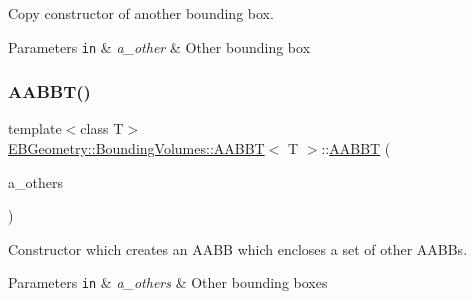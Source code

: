 Copy constructor of another bounding box. 


\begin{DoxyParams}[1]{Parameters}
\mbox{\tt in}  & {\em a\+\_\+other} & Other bounding box \\
\hline
\end{DoxyParams}
\mbox{\label{classEBGeometry_1_1BoundingVolumes_1_1AABBT_a1298160e99352a0359892b11edcfd01f}} 
\subsubsection{\texorpdfstring{A\+A\+B\+B\+T()}{AABBT()}\hspace{0.1cm}{\footnotesize\ttfamily [3/4]}}
{\footnotesize\ttfamily template$<$class T$>$ \\
\hyperlink{classEBGeometry_1_1BoundingVolumes_1_1AABBT}{E\+B\+Geometry\+::\+Bounding\+Volumes\+::\+A\+A\+B\+BT}$<$ T $>$\+::\hyperlink{classEBGeometry_1_1BoundingVolumes_1_1AABBT}{A\+A\+B\+BT} (\begin{DoxyParamCaption}\item[{const std\+::vector$<$ \hyperlink{classEBGeometry_1_1BoundingVolumes_1_1AABBT}{A\+A\+B\+BT}$<$ T $>$ $>$ \&}]{a\+\_\+others }\end{DoxyParamCaption})}



Constructor which creates an A\+A\+BB which encloses a set of other A\+A\+B\+Bs. 


\begin{DoxyParams}[1]{Parameters}
\mbox{\tt in}  & {\em a\+\_\+others} & Other bounding boxes \\
\hline
\end{DoxyParams}
\mbox{\label{classEBGeometry_1_1BoundingVolumes_1_1AABBT_a81b76c881d564ac8a8a2b98f90a0319d}} 
